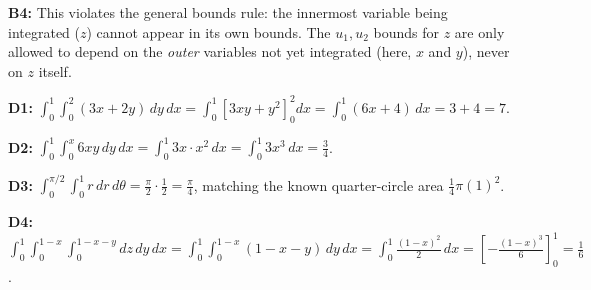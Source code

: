 \documentclass[11pt]{article}
\begin{document}
\textbf{B4:} This violates the general bounds rule: the innermost variable being integrated ($z$) cannot appear in its own bounds. The $u_1, u_2$ bounds for $z$ are only allowed to depend on the \emph{outer} variables not yet integrated (here, $x$ and $y$), never on $z$ itself.

\textbf{D1:} $\displaystyle\int_0^1\int_0^2(3x+2y)\,dy\,dx = \int_0^1\left[3xy+y^2\right]_0^2 dx = \int_0^1(6x+4)\,dx = 3+4=7$.

\textbf{D2:} $\displaystyle\int_0^1\int_0^x 6xy\,dy\,dx = \int_0^1 3x\cdot x^2\,dx = \int_0^1 3x^3\,dx = \frac{3}{4}$.

\textbf{D3:} $\displaystyle\int_0^{\pi/2}\int_0^1 r\,dr\,d\theta = \frac{\pi}{2}\cdot\frac{1}{2} = \frac{\pi}{4}$, matching the known quarter-circle area $\frac{1}{4}\pi(1)^2$. \checkmark

\textbf{D4:} $\displaystyle\int_0^1\int_0^{1-x}\int_0^{1-x-y} dz\,dy\,dx = \int_0^1\int_0^{1-x}(1-x-y)\,dy\,dx = \int_0^1 \frac{(1-x)^2}{2}\,dx = \left[-\frac{(1-x)^3}{6}\right]_0^1 = \frac{1}{6}$.
\end{document}
